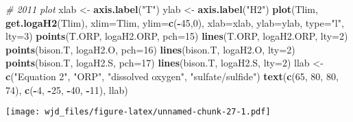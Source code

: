 \documentclass[]{article}
\newenvironment{Shaded}{\begin{snugshade}}{\end{snugshade}}
\newcommand{\KeywordTok}[1]{\textcolor[rgb]{0.13,0.29,0.53}{\textbf{#1}}}
\newcommand{\DataTypeTok}[1]{\textcolor[rgb]{0.13,0.29,0.53}{#1}}
\newcommand{\DecValTok}[1]{\textcolor[rgb]{0.00,0.00,0.81}{#1}}
\newcommand{\StringTok}[1]{\textcolor[rgb]{0.31,0.60,0.02}{#1}}
\newcommand{\CommentTok}[1]{\textcolor[rgb]{0.56,0.35,0.01}{\textit{#1}}}
\newcommand{\OperatorTok}[1]{\textcolor[rgb]{0.81,0.36,0.00}{\textbf{#1}}}
\newcommand{\NormalTok}[1]{#1}
\begin{document}
\begin{Shaded}
\begin{Highlighting}[]
\CommentTok{# 2011 plot}
\NormalTok{xlab <-}\StringTok{ }\KeywordTok{axis.label}\NormalTok{(}\StringTok{"T"}\NormalTok{)}
\NormalTok{ylab <-}\StringTok{ }\KeywordTok{axis.label}\NormalTok{(}\StringTok{"H2"}\NormalTok{)}
\KeywordTok{plot}\NormalTok{(Tlim, }\KeywordTok{get.logaH2}\NormalTok{(Tlim), }\DataTypeTok{xlim=}\NormalTok{Tlim, }\DataTypeTok{ylim=}\KeywordTok{c}\NormalTok{(}\OperatorTok{-}\DecValTok{45}\NormalTok{,}\DecValTok{0}\NormalTok{),}
\DataTypeTok{xlab=}\NormalTok{xlab, }\DataTypeTok{ylab=}\NormalTok{ylab, }\DataTypeTok{type=}\StringTok{"l"}\NormalTok{, }\DataTypeTok{lty=}\DecValTok{3}\NormalTok{)}
\KeywordTok{points}\NormalTok{(T.ORP, logaH2.ORP, }\DataTypeTok{pch=}\DecValTok{15}\NormalTok{)}
\KeywordTok{lines}\NormalTok{(T.ORP, logaH2.ORP, }\DataTypeTok{lty=}\DecValTok{2}\NormalTok{)}
\KeywordTok{points}\NormalTok{(bison.T, logaH2.O, }\DataTypeTok{pch=}\DecValTok{16}\NormalTok{)}
\KeywordTok{lines}\NormalTok{(bison.T, logaH2.O, }\DataTypeTok{lty=}\DecValTok{2}\NormalTok{)}
\KeywordTok{points}\NormalTok{(bison.T, logaH2.S, }\DataTypeTok{pch=}\DecValTok{17}\NormalTok{)}
\KeywordTok{lines}\NormalTok{(bison.T, logaH2.S, }\DataTypeTok{lty=}\DecValTok{2}\NormalTok{)}
\NormalTok{llab <-}\StringTok{ }\KeywordTok{c}\NormalTok{(}\StringTok{"Equation 2"}\NormalTok{, }\StringTok{"ORP"}\NormalTok{, }\StringTok{"dissolved oxygen"}\NormalTok{, }\StringTok{"sulfate/sulfide"}\NormalTok{)}
\KeywordTok{text}\NormalTok{(}\KeywordTok{c}\NormalTok{(}\DecValTok{65}\NormalTok{, }\DecValTok{80}\NormalTok{, }\DecValTok{80}\NormalTok{, }\DecValTok{74}\NormalTok{), }\KeywordTok{c}\NormalTok{(}\OperatorTok{-}\DecValTok{4}\NormalTok{, }\OperatorTok{-}\DecValTok{25}\NormalTok{, }\OperatorTok{-}\DecValTok{40}\NormalTok{, }\OperatorTok{-}\DecValTok{11}\NormalTok{), llab)}
\end{Highlighting}
\end{Shaded}

\texttt{[image: wjd\_files/figure-latex/unnamed-chunk-27-1.pdf]}
\end{document}
